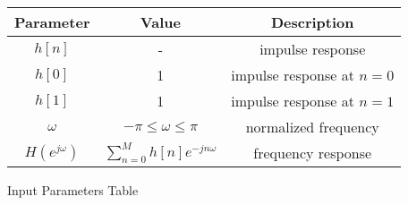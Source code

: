 \centering
\begin{tabular}{|c|c|c|}
	\hline
	\textbf{Parameter} & \textbf{Value} & \textbf{Description} \\
	\hline
	$h[n]$ & - & impulse response \\
	\hline
	$h[0]$ & 1 & impulse response at $n=0$ \\
	\hline
	$h[1]$ & 1 & impulse response at $n=1$ \\
	\hline
	$\omega$ & $-\pi\leq\omega\leq\pi$ & normalized frequency \\
	\hline
	$H(e^{j\omega})$ & $\sum_{n=0}^{M} h[n]e^{-jn\omega}$ & frequency response \\
    	\hline
\end{tabular}
\caption{Input Parameters Table}
\label{tab:gate23bm17.1}
